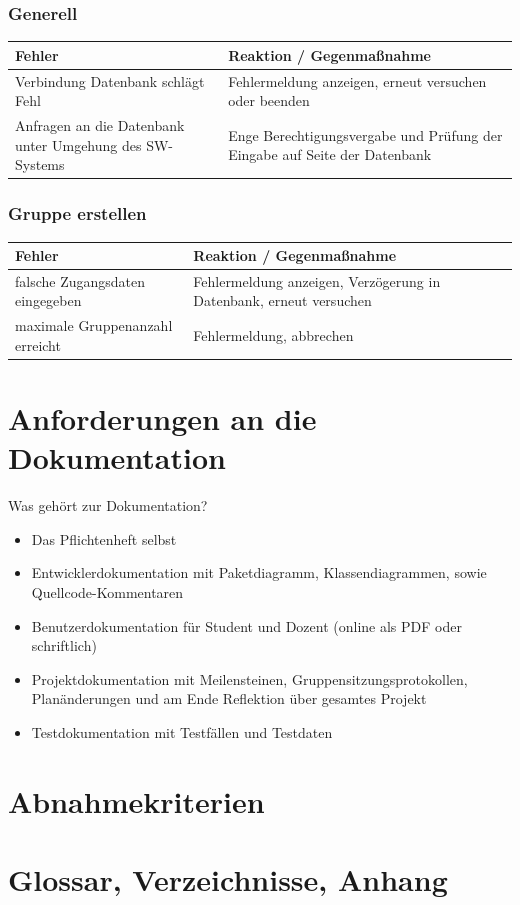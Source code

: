 \documentclass{article}
\begin{document}
\section{Generell}
\begin{tabular}{|p{7cm}|p{7cm}|}
\hline
	\textbf{Fehler}												&	\textbf{Reaktion / Gegenmaßnahme}						\\
\hline
\hline
	Verbindung Datenbank schlägt Fehl							&	Fehlermeldung anzeigen, erneut versuchen oder beenden	\\
\hline
	Anfragen an die Datenbank unter Umgehung des SW-Systems		&	Enge Berechtigungsvergabe und Prüfung der Eingabe auf Seite der Datenbank \\
\hline
\end{tabular}

\section{Gruppe erstellen}
\begin{tabular}{|p{7cm}|p{7cm}|}
\hline
	\textbf{Fehler}					&	\textbf{Reaktion / Gegenmaßnahme}									\\
\hline
\hline
	falsche Zugangsdaten eingegeben	&	Fehlermeldung anzeigen, Verzögerung in Datenbank, erneut versuchen	\\
\hline
	maximale Gruppenanzahl erreicht	&	Fehlermeldung, abbrechen											\\
\hline
\end{tabular}

\newpage
\part{Anforderungen an die Dokumentation}
Was gehört zur Dokumentation?
\begin{itemize}
\item Das Pflichtenheft selbst
\item Entwicklerdokumentation mit Paketdiagramm, Klassendiagrammen, sowie Quellcode-Kommentaren
\item Benutzerdokumentation für Student und Dozent (online als PDF oder schriftlich)
\item Projektdokumentation mit Meilensteinen, Gruppensitzungsprotokollen, Planänderungen und am Ende Reflektion über gesamtes Projekt
\item Testdokumentation mit Testfällen und Testdaten
\end{itemize}

\newpage
\part{Abnahmekriterien}


\newpage
\part{Glossar, Verzeichnisse, Anhang}
\end{document}
